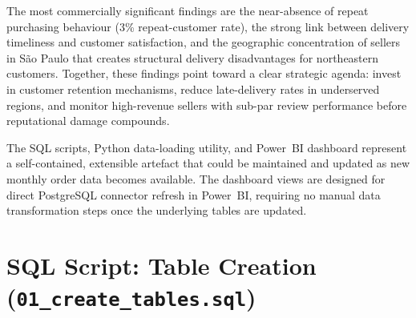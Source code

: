 \documentclass[12pt,a4paper]{article}
\begin{document}
The most commercially significant findings are the near-absence of repeat purchasing
behaviour (3\% repeat-customer rate), the strong link between delivery timeliness and
customer satisfaction, and the geographic concentration of sellers in São Paulo that
creates structural delivery disadvantages for northeastern customers. Together, these
findings point toward a clear strategic agenda: invest in customer retention mechanisms,
reduce late-delivery rates in underserved regions, and monitor high-revenue sellers with
sub-par review performance before reputational damage compounds.

The SQL scripts, Python data-loading utility, and Power~BI dashboard represent a
self-contained, extensible artefact that could be maintained and updated as new monthly
order data becomes available. The dashboard views are designed for direct PostgreSQL
connector refresh in Power~BI, requiring no manual data transformation steps once the
underlying tables are updated.

\appendix

\section{SQL Script: Table Creation (\texttt{01\_create\_tables.sql})}
\label{app:create_tables}
\end{document}
